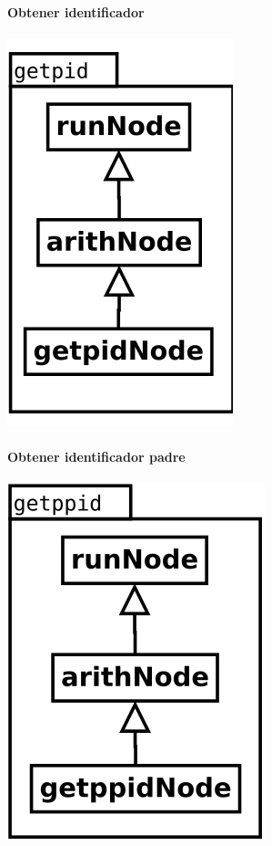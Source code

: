 \begin{multicols}{2}
   \paragraph {Obtener identificador } 
   \begin{center}
   \includegraphics[scale=0.4]{getpid.png} \\
   \end{center}
\columnbreak
   \paragraph {Obtener identificador padre} 
   \begin{center}
   \includegraphics[scale=0.4]{getppid.png} \\
   \end{center}
\end{multicols}


